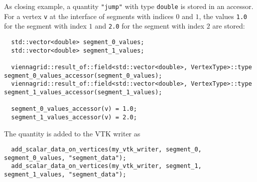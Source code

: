  As closing example, a quantity \lstinline|"jump"| with type \lstinline|double| is stored in an accessor.
 For a vertex \lstinline|v| at the interface of segments with indices $0$ and $1$, the values \lstinline|1.0| for the segment with index $1$ and \lstinline|2.0| for the segment with index $2$ are stored:
 \begin{lstlisting}
  std::vector<double> segment_0_values;
  std::vector<double> segment_1_values;
  
  viennagrid::result_of::field<std::vector<double>, VertexType>::type segment_0_values_accessor(segment_0_values);
  viennagrid::result_of::field<std::vector<double>, VertexType>::type segment_1_values_accessor(segment_1_values);
 
  segment_0_values_accessor(v) = 1.0;
  segment_1_values_accessor(v) = 2.0;
 \end{lstlisting}
 The quantity is added to the VTK writer as
 \begin{lstlisting}
  add_scalar_data_on_vertices(my_vtk_writer, segment_0, segment_0_values, "segment_data");
  add_scalar_data_on_vertices(my_vtk_writer, segment_1, segment_1_values, "segment_data");
 \end{lstlisting}

